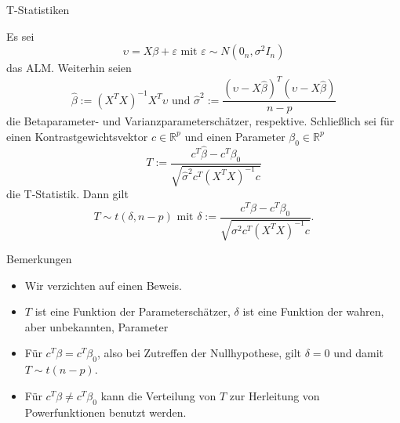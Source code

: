 \documentclass[
  8pt,
  ignorenonframetext,
]{beamer}
\providecommand{\tightlist}{%
  \setlength{\itemsep}{0pt}\setlength{\parskip}{0pt}}
\begin{document}
\begin{frame}{T-Statistiken}
\protect\hypertarget{t-statistiken-2}{}
\vspace{1mm}
\footnotesize
\begin{theorem}[T-Statistik]
\normalfont
\justifying
Es sei 
\begin{equation}
\upsilon = X\beta + \varepsilon \mbox{ mit } \varepsilon \sim N(0_n,\sigma^2I_n) 
\end{equation}
das ALM. Weiterhin seien 
\begin{equation}
\hat{\beta} := (X^TX)^{-1}X^T\upsilon \mbox{ und } \hat{\sigma}^2 := \frac{(\upsilon-X\hat{\beta})^T(\upsilon-X\hat{\beta})}{n-p} 
\end{equation}
die Betaparameter- und Varianzparameterschätzer, respektive. Schließlich sei für 
einen Kontrastgewichtsvektor $c \in \mathbb{R}^p$ und einen Parameter 
$\beta_0 \in \mathbb{R}^p$ 
\begin{equation}
T := \frac{c^T\hat{\beta} - c^T\beta_0}{\sqrt{\hat{\sigma}^2 c^T(X^TX)^{-1}c}}  
\end{equation}
die T-Statistik. Dann gilt 
\begin{equation}
T \sim t(\delta, n-p) \mbox{ mit } \delta := \frac{c^T\beta - c^T\beta_0}{\sqrt{\sigma^2 c^T(X^TX)^{-1}c}}. 
\end{equation}
\end{theorem}
\vspace{-2mm}

Bemerkungen \vspace{-2mm}

\begin{itemize}
\tightlist
\item
  Wir verzichten auf einen Beweis.
\item
  \(T\) ist eine Funktion der Parameterschätzer, \(\delta\) ist eine
  Funktion der wahren, aber unbekannten, Parameter
\item
  Für \(c^T\beta = c^T\beta_0\), also bei Zutreffen der Nullhypothese,
  gilt \(\delta = 0\) und damit \(T \sim t(n-p)\).
\item
  Für \(c^T\beta \neq c^T\beta_0\) kann die Verteilung von \(T\) zur
  Herleitung von Powerfunktionen benutzt werden.
\end{itemize}
\end{frame}
\end{document}
